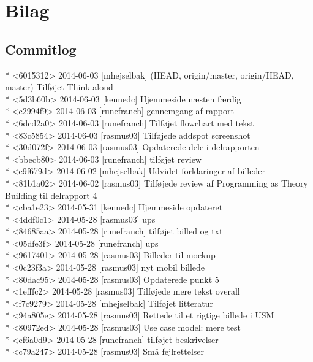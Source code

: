 \documentclass[12pt]{article}
\begin{document}
\section{Bilag}

\subsection*{Commitlog}
* <6015312> 2014-06-03 [mhejselbak]  (HEAD, origin/master, origin/HEAD, master) Tilføjet Think-aloud \\
* <5d3b60b> 2014-06-03 [kennedc]  Hjemmeside næsten færdig \\
* <c2994f9> 2014-06-03 [runefranch]  gennemgang af rapport \\
* <6dcd2a0> 2014-06-03 [runefranch]  Tilføjet flowchart med tekst\\
* <83c5854> 2014-06-03 [rasmus03]  Tilføjede addspot screenshot\\
* <30d072f> 2014-06-03 [rasmus03]  Opdaterede dele i delrapporten\\
* <bbecb80> 2014-06-03 [runefranch]  tilføjet review\\
* <e9f679d> 2014-06-02 [mhejselbak]  Udvidet forklaringer af billeder\\
* <81b1a02> 2014-06-02 [rasmus03]  Tilføjede review af Programming as Theory Building til delrapport 4\\
* <cba1e23> 2014-05-31 [kennedc]  Hjemmeside opdateret\\
* <4ddf0c1> 2014-05-28 [rasmus03]  ups\\
* <84685aa> 2014-05-28 [runefranch]  tilføjet billed og txt\\
* <05dfe3f> 2014-05-28 [runefranch]  ups\\
* <9617401> 2014-05-28 [rasmus03]  Billeder til mockup\\
* <0c23f3a> 2014-05-28 [rasmus03]  nyt mobil billede\\
* <80dac95> 2014-05-28 [rasmus03]  Opdaterede punkt 5\\
* <1efffc2> 2014-05-28 [rasmus03]  Tilføjede mere tekst overall\\
* <f7c9279> 2014-05-28 [mhejselbak]  Tilføjet litteratur\\
* <94a805e> 2014-05-28 [rasmus03]  Rettede til et rigtige billede i USM\\
* <80972ed> 2014-05-28 [rasmus03]  Use case model: mere test\\
* <ef6a0d9> 2014-05-28 [runefranch]  tilføjet beskrivelser\\
* <c79a247> 2014-05-28 [rasmus03]  Små fejlrettelser\\
\end{document}
